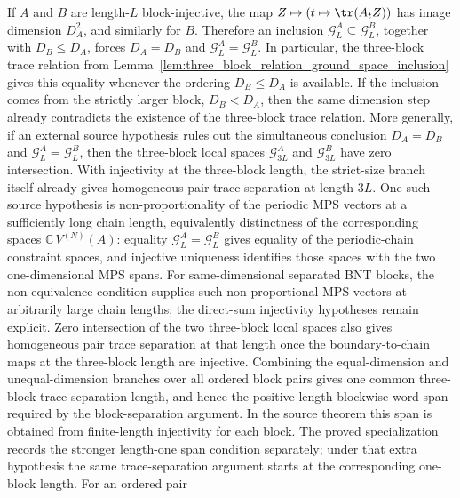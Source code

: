 \begin{lemma}
    \leanok
    If $A$ and $B$ are length-$L$ block-injective, the map
    $Z\mapsto(t\mapsto\tr(A_tZ))$ has image dimension $D_A^2$, and
    similarly for $B$. Therefore an inclusion
    $\mathcal G_L^A\subseteq \mathcal G_L^B$, together with
    $D_B\le D_A$, forces $D_A=D_B$ and
    $\mathcal G_L^A=\mathcal G_L^B$. In particular, the three-block
    trace relation from
    Lemma~\ref{lem:three_block_relation_ground_space_inclusion} gives this
    equality whenever the ordering \(D_B\le D_A\) is available. If the
    inclusion comes from the strictly larger block, $D_B<D_A$, then the same
    dimension step already contradicts the existence of the three-block trace
    relation. More generally, if an external source hypothesis rules out the
    simultaneous conclusion $D_A=D_B$ and
    $\mathcal G_L^A=\mathcal G_L^B$, then the three-block local spaces
    $\mathcal G_{3L}^A$ and $\mathcal G_{3L}^B$ have zero intersection.
    With injectivity at the three-block length, the strict-size branch itself
    already gives homogeneous pair trace separation at length $3L$.
    One such source hypothesis is non-proportionality of the periodic MPS vectors
    at a sufficiently long chain length, equivalently distinctness of the
    corresponding spaces $\mathbb C\,V^{(N)}(A)$: equality
    \(\mathcal G_L^A=\mathcal G_L^B\) gives
    equality of the periodic-chain constraint spaces, and injective uniqueness
    identifies those spaces with the two one-dimensional MPS spans. For same-dimensional
    separated BNT blocks, the non-equivalence condition supplies such
    non-proportional MPS vectors at arbitrarily large chain lengths; the
    direct-sum injectivity hypotheses remain explicit. Zero intersection of
    the two three-block local spaces also gives homogeneous pair trace
    separation at that length once the boundary-to-chain maps at the
    three-block length are injective. Combining the equal-dimension and
    unequal-dimension branches over all ordered block pairs gives one common
    three-block trace-separation length, and hence the positive-length
    blockwise word span required by the block-separation argument. In the
    source theorem this span is obtained from finite-length injectivity for
    each block. The proved specialization records the stronger length-one span
    condition separately; under that extra hypothesis the same trace-separation
    argument starts at the corresponding one-block length. For an ordered pair

\end{lemma}
